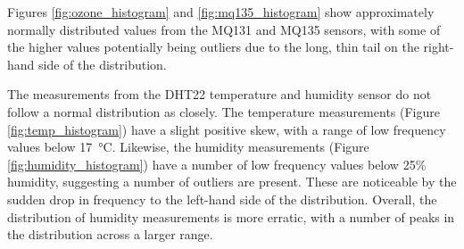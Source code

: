 \documentclass[11pt,twosided,a4paper]{report}
\begin{document}
Figures \ref{fig:ozone_histogram} and \ref{fig:mq135_histogram} show approximately normally distributed values from the MQ131 and MQ135 sensors, with some of the higher values potentially being outliers due to the long, thin tail on the right-hand side of the distribution.

The measurements from the DHT22 temperature and humidity sensor do not follow a normal distribution as closely. The temperature measurements (Figure \ref{fig:temp_histogram}) have a slight positive skew, with a range of low frequency values below \SI{17}{\celsius}. Likewise, the humidity measurements (Figure \ref{fig:humidity_histogram}) have a number of low frequency values below 25\% humidity, suggesting a number of outliers are present. These are noticeable by the sudden drop in frequency to the left-hand side of the distribution. Overall, the distribution of humidity measurements is more erratic, with a number of peaks in the distribution across a larger range.
\end{document}
